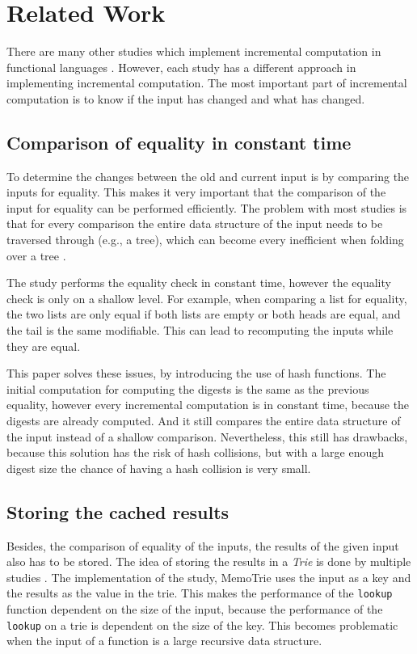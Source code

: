 \section{Related Work}

There are many other studies which implement incremental computation in functional languages\cite*{hinze2000memo} \cite*{acar2006adaptive} \cite*{firsov2016purely} \cite*{carlsson2002monads}. However, each study has a different approach in implementing incremental computation. The most important part of incremental computation is to know if the input has changed and what has changed. 

\subsection{Comparison of equality in constant time}
To determine the changes between the old and current input is by comparing the inputs for equality. This makes it very important that the comparison of the input for equality can be performed efficiently. The problem with most studies is that for every comparison the entire data structure of the input needs to be traversed through (e.g., a tree), which can become every inefficient when folding over a tree \cite*{hinze2000memo} \cite*{bransen2013generic}. 

The study \cite*{carlsson2002monads} performs the equality check in constant time, however the equality check is only on a shallow level. For example, when comparing a list for equality, the two lists are only equal if both lists are empty or both heads are equal, and the tail is the same modifiable. This can lead to recomputing the inputs while they are equal. 

This paper solves these issues, by introducing the use of hash functions. The initial computation for computing the digests is the same as the previous equality, however every incremental computation is in constant time, because the digests are already computed. And it still compares the entire data structure of the input instead of a shallow comparison. Nevertheless, this still has drawbacks, because this solution has the risk of hash collisions, but with a large enough digest size the chance of having a hash collision is very small.

\subsection{Storing the cached results}
Besides, the comparison of equality of the inputs, the results of the given input also has to be stored. The idea of storing the results in a \textit{Trie} is done by multiple studies \cite*{hinze2000memo} \cite*{miraldo2019efficient}. The implementation of the \cite*{hinze2000memo} study, MemoTrie\cite*{hackage2022memotrie} uses the input as a key and the results as the value in the trie. This makes the performance of the \texttt{lookup} function dependent on the size of the input, because the performance of the \texttt{lookup} on a trie is dependent on the size of the key. This becomes problematic when the input of a function is a large recursive data structure. 

